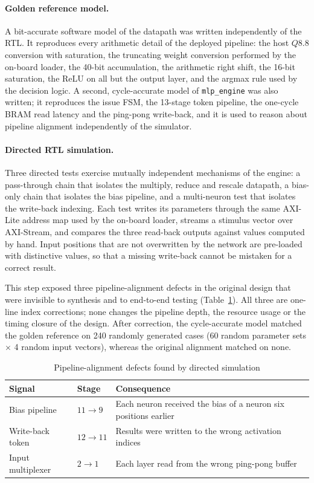 \documentclass[final,5p,times,twocolumn]{elsarticle}
\begin{document}
\paragraph{Golden reference model.}
A bit-accurate software model of the datapath was written independently of the
RTL. It reproduces every arithmetic detail of the deployed pipeline: the host
$Q8.8$ conversion with saturation, the truncating weight conversion performed by
the on-board loader, the 40-bit accumulation, the arithmetic right shift, the
16-bit saturation, the ReLU on all but the output layer, and the argmax rule
used by the decision logic. A second, cycle-accurate model of
\texttt{mlp\_engine} was also written; it reproduces the issue FSM, the 13-stage
token pipeline, the one-cycle BRAM read latency and the ping-pong write-back,
and it is used to reason about pipeline alignment independently of the
simulator.

\paragraph{Directed RTL simulation.}
Three directed tests exercise mutually independent mechanisms of the engine: a
pass-through chain that isolates the multiply, reduce and rescale datapath, a
bias-only chain that isolates the bias pipeline, and a multi-neuron test that
isolates the write-back indexing. Each test writes its parameters through the
same AXI-Lite address map used by the on-board loader, streams a stimulus vector
over AXI-Stream, and compares the three read-back outputs against values
computed by hand. Input positions that are not overwritten by the network are
pre-loaded with distinctive values, so that a missing write-back cannot be
mistaken for a correct result.

This step exposed three pipeline-alignment defects in the original design that
were invisible to synthesis and to end-to-end testing
(Table~\ref{tab:rtl_defects}). All three are one-line index corrections; none
changes the pipeline depth, the resource usage or the timing closure of the
design. After correction, the cycle-accurate model matched the golden reference
on 240 randomly generated cases (60 random parameter sets $\times$ 4 random
input vectors), whereas the original alignment matched on none.

\begin{table}[htbp]
\centering
\caption{Pipeline-alignment defects found by directed simulation}
\label{tab:rtl_defects}
\small
\begin{tabular}{@{}p{2.0cm}p{1.0cm}p{4.4cm}@{}}
\toprule
Signal & Stage & Consequence \\
\midrule
Bias pipeline & $11\!\rightarrow\!9$ & Each neuron received the bias of a neuron six positions earlier \\
Write-back token & $12\!\rightarrow\!11$ & Results were written to the wrong activation indices \\
Input multiplexer & $2\!\rightarrow\!1$ & Each layer read from the wrong ping-pong buffer \\
\bottomrule
\end{tabular}
\end{table}
\end{document}
